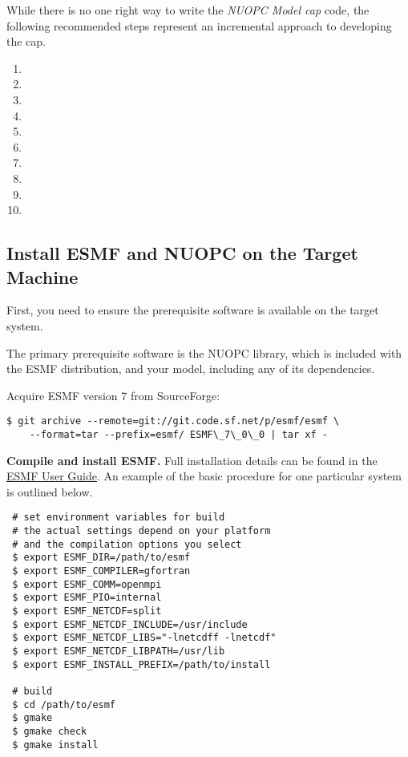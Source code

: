 
\label{sec:approach}

While there is no one right way to write the \emph{NUOPC Model cap} code, the following
recommended steps represent an incremental approach to developing the cap.
\begin{enumerate}
\item {}
\item {}
\item {}
\item {}
\item {}
\item {}
\item {}
\item {}
\item {}
\item {}
\end{enumerate}

\subsection{Install ESMF and NUOPC on the Target Machine}
\label{sec:installesmf}
First, you need to ensure the prerequisite
software is available on the target system.

The primary prerequisite software is the NUOPC library, which is
included with the ESMF distribution, and your model, including
any of its dependencies.

Acquire ESMF version 7 from SourceForge:

\begin{verbatim}
$ git archive --remote=git://git.code.sf.net/p/esmf/esmf \ 
    --format=tar --prefix=esmf/ ESMF\_7\_0\_0 | tar xf - 
\end{verbatim}

\textbf{Compile and install ESMF.}  Full installation details can be found in the \href{http://www.earthsystemmodeling.org/esmf\_releases/public/last/ESMF\_usrdoc/node6.html\#SECTION00064000000000000000}{ESMF User Guide}.  An example of the basic procedure
for one particular system is outlined below.

\begin{verbatim}
 # set environment variables for build
 # the actual settings depend on your platform
 # and the compilation options you select
 $ export ESMF_DIR=/path/to/esmf
 $ export ESMF_COMPILER=gfortran
 $ export ESMF_COMM=openmpi
 $ export ESMF_PIO=internal
 $ export ESMF_NETCDF=split
 $ export ESMF_NETCDF_INCLUDE=/usr/include
 $ export ESMF_NETCDF_LIBS="-lnetcdff -lnetcdf"
 $ export ESMF_NETCDF_LIBPATH=/usr/lib
 $ export ESMF_INSTALL_PREFIX=/path/to/install

 # build
 $ cd /path/to/esmf
 $ gmake
 $ gmake check
 $ gmake install
\end{verbatim}


